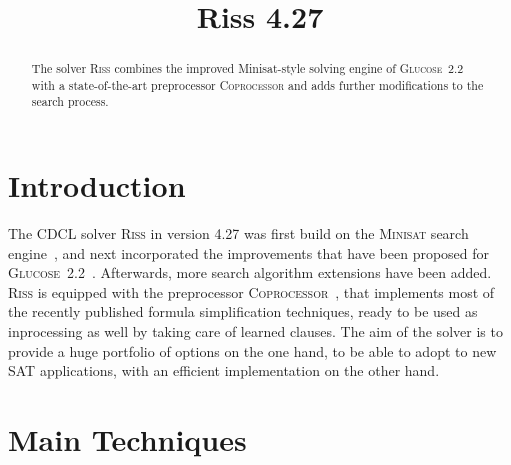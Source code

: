 \documentclass[conference]{IEEEtran}
\begin{document}
	
\title{Riss 4.27}

\author{
}

\maketitle

\def\coprocessor{\textsc{Coprocessor}\xspace}
\def\glucose{\textsc{Glucose~2.2}\xspace}
\def\minisat{\textsc{Minisat~2.2}\xspace}
\def\riss{\textsc{Riss}\xspace}

\begin{abstract}
The solver \textsc{Riss} combines the improved Minisat-style solving engine of \glucose with a state-of-the-art preprocessor \textsc{Coprocessor} and adds further modifications to the search process. 
\end{abstract}

\section{Introduction}

The CDCL solver \riss in version 4.27 was first build on the \textsc{Minisat} search engine~\cite{EenS:2003}, and next incorporated the improvements that have been proposed for \glucose ~\cite{AudemardS:2009,Audemard:2012:RRS:2405292.2405308}. 
Afterwards, more search algorithm extensions have been added. 
\riss is equipped with the preprocessor \textsc{Coprocessor}~\cite{Manthey:2012}, 
that implements most of the recently published formula simplification techniques, ready to be used as inprocessing as well by taking care of learned clauses. 
The aim of the solver is to provide a huge portfolio of options on the one hand, to be able to adopt to new SAT applications, with an efficient implementation on the other hand. 

\section{Main Techniques}
\end{document}

